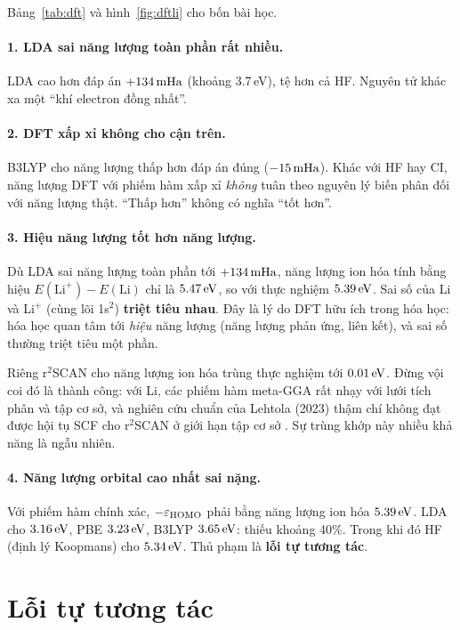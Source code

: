 Bảng~\ref{tab:dft} và hình~\ref{fig:dftli} cho bốn bài học.

\paragraph{1. LDA sai năng lượng toàn phần rất nhiều.} LDA cao hơn đáp án $+134\,\mathrm{mHa}$ (khoảng 3.7\,eV), tệ hơn cả HF. Nguyên tử khác xa một ``khí electron đồng nhất''.

\paragraph{2. DFT xấp xỉ không cho cận trên.} B3LYP cho năng lượng thấp hơn đáp án đúng ($-15\,\mathrm{mHa}$). Khác với HF hay CI, năng lượng DFT với phiếm hàm xấp xỉ \emph{không} tuân theo nguyên lý biến phân đối với năng lượng thật. ``Thấp hơn'' không có nghĩa ``tốt hơn''.

\paragraph{3. Hiệu năng lượng tốt hơn năng lượng.} Dù LDA sai năng lượng toàn phần tới $+134\,\mathrm{mHa}$, năng lượng ion hóa tính bằng hiệu $E(\text{Li}^+)-E(\text{Li})$ chỉ là $5.47\,\mathrm{eV}$, so với thực nghiệm $5.39\,\mathrm{eV}$. Sai số của Li và Li$^+$ (cùng lõi 1s$^2$) \textbf{triệt tiêu nhau}. Đây là lý do DFT hữu ích trong hóa học: hóa học quan tâm tới \emph{hiệu} năng lượng (năng lượng phản ứng, liên kết), và sai số thường triệt tiêu một phần.

Riêng r$^2$SCAN cho năng lượng ion hóa trùng thực nghiệm tới $0.01\,\mathrm{eV}$. Đừng vội coi đó là thành công: với Li, các phiếm hàm meta-GGA rất nhạy với lưới tích phân và tập cơ sở, và nghiên cứu chuẩn của Lehtola (2023) thậm chí không đạt được hội tụ SCF cho r$^2$SCAN ở giới hạn tập cơ sở \cite{Lehtola2023}. Sự trùng khớp này nhiều khả năng là ngẫu nhiên.

\paragraph{4. Năng lượng orbital cao nhất sai nặng.} Với phiếm hàm chính xác, $-\varepsilon_{\rm HOMO}$ phải bằng năng lượng ion hóa $5.39\,\mathrm{eV}$. LDA cho $3.16\,\mathrm{eV}$, PBE $3.23\,\mathrm{eV}$, B3LYP $3.65\,\mathrm{eV}$: thiếu khoảng 40\%. Trong khi đó HF (định lý Koopmans) cho $5.34\,\mathrm{eV}$. Thủ phạm là \textbf{lỗi tự tương tác}.

\section{Lỗi tự tương tác}

